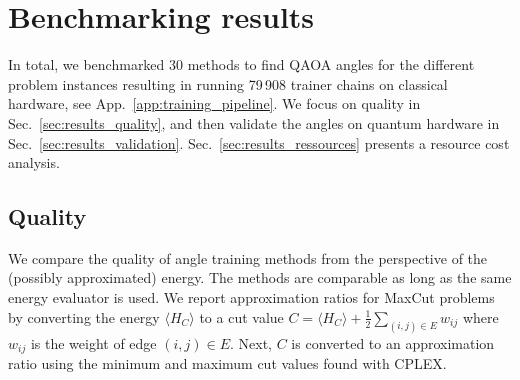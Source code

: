 \documentclass[twocolumn,
english,
aps,
pra,
10pt,
longbibliography,
superscriptaddress,
amsmath,
amssymb,
floatfix
]{revtex4-2}
\begin{document}
{\begin{table}[!htbp]
    \centering
    
    \caption{Average approximation ratio and number of graph instances for different methods and graph types, with depth-ten QAOA.
    Graph types shown are Erd\H{o}s-R\'{e}nyi (ER), heavy-hex (HH), line-based (LB), and random-regular (RR).
    The average approximation ratios are shown, with their standard deviation, over all graph instances of a given type.
    The number of evaluated graph instances are shown with the range of number of nodes in square brackets.
    Combinations of methods and graph types that were not evaluated are denoted with a hyphen.
    Methods that employed QAOA angle optimization are marked with a star, e.g., Fixed Angle$^\star$.
    Cells are colored such that higher values are darker.
    Purple, orange, green, and blue denote Matrix Product State (MPS) with Qiskit Aer, MPS with Quimb, Pauli-Propagation (PP), and Statevector (SV) energy-evaluation methods for approximation ratios, respectively.
    Pink/purple is used for all cells denoting the number of instances, regardless of the evaluation method.
    }
    \label{tab:summary_p10}
\end{table}


\section{Benchmarking results\label{sec:res}}

In total, we benchmarked 30 methods to find QAOA angles for the different problem instances resulting in running 79\,908 trainer chains on classical hardware, see App.~\ref{app:training_pipeline}.
We focus on quality in Sec.~\ref{sec:results_quality}, and then validate the angles on quantum hardware in Sec.~\ref{sec:results_validation}.
Sec.~\ref{sec:results_ressources} presents a resource cost analysis.

\subsection{Quality\label{sec:results_quality}}

We compare the quality of angle training methods from the perspective of the (possibly approximated) energy.
The methods are comparable as long as the same energy evaluator is used.
We report approximation ratios for MaxCut problems by converting the energy $\langle H_C\rangle$ to a cut value $C=\langle H_C\rangle+\frac{1}{2}\sum_{(i,j)\in E}w_{ij}$ where $w_{ij}$ is the weight of edge $(i,j)\in E$.
Next, $C$ is converted to an approximation ratio using the minimum and maximum cut values found with CPLEX.

}
\end{document}
